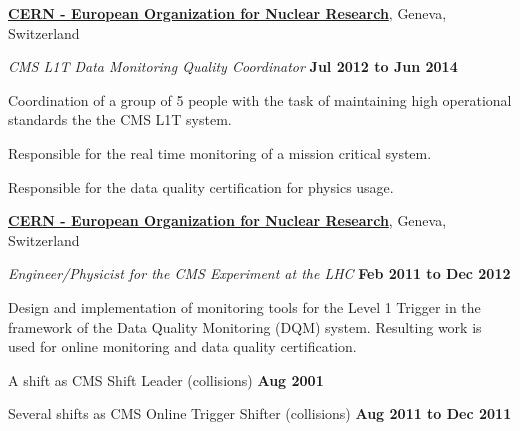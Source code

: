 \documentclass[10pt]{article}
\newenvironment{outerlist}[1][\enskip\textbullet]%
        {\begin{itemize}[#1]}{\end{itemize}%
         \vspace{-.6\baselineskip}}
\newenvironment{innerlist}[1][\enskip\textbullet]%
        {\begin{compactitem}[#1]}{\end{compactitem}}
\newcommand{\blankline}{\quad\pagebreak[2]}
\begin{document}
%
\href{http://www.cern.ch/}{\textbf{CERN - European Organization for Nuclear Research}},
Geneva, Switzerland
\begin{outerlist}

\item[] \textit{CMS L1T Data Monitoring Quality Coordinator}%
        \hfill \textbf{Jul 2012 to Jun 2014}
\begin{innerlist}
\item Coordination of a group of 5 people with the task of maintaining high operational standards the the CMS L1T system. 
\item Responsible for the real time monitoring of a mission critical system.
\item Responsible for the data quality certification for physics usage.
\end{innerlist}

\end{outerlist}
\blankline

%
\href{http://www.cern.ch/}{\textbf{CERN - European Organization for Nuclear Research}},
Geneva, Switzerland
\begin{outerlist}

\item[] \textit{Engineer/Physicist for the CMS Experiment at the LHC}%
        \hfill \textbf{Feb 2011 to Dec 2012}
\begin{innerlist}
\item Design and implementation of monitoring tools for the Level 1 Trigger in the framework of
      the Data Quality Monitoring (DQM) system. Resulting work is used for online monitoring and
      data quality certification. 
\item A shift as CMS Shift Leader (collisions) \hfill \textbf{Aug 2001}
\item Several shifts as CMS Online Trigger Shifter (collisions) \hfill \textbf{Aug 2011 to Dec 2011}
\end{innerlist}

\end{outerlist}
\blankline
\end{document}
